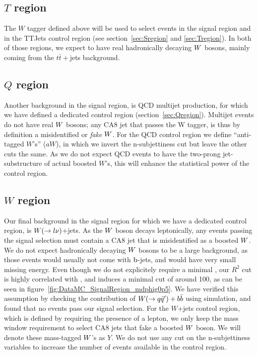
\subsection{\texorpdfstring{$T$}{T} region \label{sec:boost_T_region}}

The $W$ tagger defined above will be used to select events in the signal region and in the TTJets
control region (see section~\ref{sec:Sregion} and \ref{sec:Tregion}). In both of those regions, we
expect to have real hadronically decaying $W$ bosons, mainly coming from the $t\bar{t}+$jets
background. 

\subsection{\texorpdfstring{$Q$}{Q} region}

Another background in the signal region, is QCD multijet production, for which we have defined a
dedicated control region (section~\ref{sec:Qregion}). Multijet events do not have real $W$ bosons;
any CA8 jet that passes the W tagger, is thus by definition a misidentified or \textit{fake} $W$. 
For the QCD control region we define ``anti-tagged $W$'s'' ($aW$), in which we invert the
n-subjettiness cut but leave the other cuts the same. 
As we do not expect QCD events to have the two-prong jet-substructure of actual boosted $W$'s, this
will enhance the statistical power of the control region. 

\subsection{\texorpdfstring{$W$}{W} region}

Our final background in the signal region for which we have a dedicated control region, is
$W(\rightarrow l\nu)$+jets. 
As the $W$ boson decays leptonically, any events passing the signal selection must contain a CA8
jet that is misidentified as a boosted $W$. 
We do not expect hadronically decaying $W$ bosons to be a large background, as those events would
usually not come with $\mathrm{b}$-jets, and would have very small missing energy. Even though we do not
explicitely require a minimal \ETm, our $R^2$ cut is highly correlated with \ETm, and induces
a minimal cut of around 100\GeV, as can be seen in figure~\ref{fig:DataMC_SignalRegion_mdphig0p5}.  
We have verified this assumption by checking the contribution of $W(\rightarrow
q\bar{q}')+b\bar{b}$ using simulation, and found that no events pass our signal selection. 
For the $W$+jets control region, which is defined by requiring the presence of a lepton, we only
keep the mass window requirement to select CA8 jets that fake a boosted $W$ boson. We will denote
these mass-tagged $W$'s as $Y$. We do not use any cut on the n-subjettiness variables to increase
the number of events available in the control region. 
